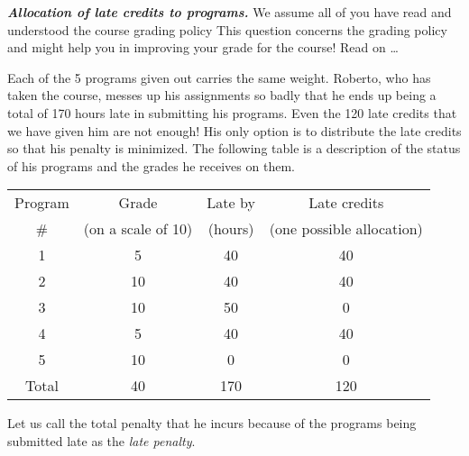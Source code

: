 {\large\bfseries\itshape Allocation of late credits to programs.} 
We assume all of you have read and understood the course grading
policy This question concerns the grading policy and might help you in
improving your grade for the course! Read on \dots

Each of the 5 programs given out carries the same weight. Roberto, who
has taken the course, messes up his assignments so badly that he ends
up being a total of 170 hours late in submitting his programs. 
Even the 120 late credits that we have given him are not enough! His
only option is to distribute the late credits so that his penalty is
minimized. The following table is a description of the status of his
programs and the grades he receives on them.  \\


\begin{center}
\renewcommand{\arraystretch}{1.2}
\begin{tabular}{|c|c|c|c|}
\hline
Program & Grade               & Late by   & Late credits    \\
\#            & (on a scale of 10)  & (hours)   & (one possible allocation) \\    \hline
\hline
1  &  5 & 40 & 40 \\  \hline
2  & 10 & 40 & 40 \\  \hline
3  & 10 & 50 &  0 \\  \hline
4  &  5 & 40 & 40 \\  \hline
5  & 10 &  0 &  0 \\  \hline
Total & 40 & 170 & 120 \\
\hline

\end{tabular}
\end{center}
\vspace{2mm}

Let us call the total penalty that he incurs because of the programs
being submitted late as the \emph{late penalty}.

